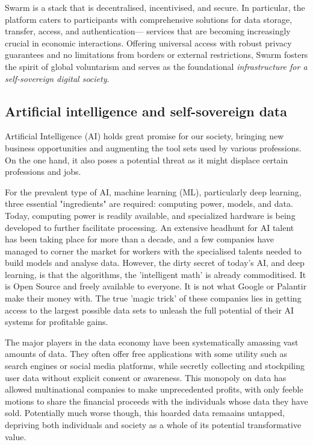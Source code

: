 Swarm is a  stack that is decentralised, incentivised, and secure. In particular, the platform caters to participants with comprehensive solutions for data storage, transfer, access, and authentication— services that are becoming increasingly crucial in economic interactions. Offering universal access with robust privacy guarantees and no limitations from borders or external restrictions, Swarm fosters the spirit of global voluntarism and serves as the foundational \emph{infrastructure for a self-sovereign digital society}.

\subsection{Artificial intelligence and self-sovereign data \statusgreen} \label{sec:AIdata}

Artificial Intelligence (AI) holds great promise for our society, bringing new business opportunities and augmenting the tool sets used by various professions. On the one hand, it also poses a potential threat as it might displace certain professions and jobs\cite{Lee2018Sep}.

For the prevalent type of AI, machine learning (ML), particularly deep learning, three essential "ingredients" are required: computing power, models, and data. Today, computing power is readily available, and specialized hardware is being developed to further facilitate processing. An extensive headhunt for AI talent has been taking place for more than a decade, and a few companies have managed to corner the market for workers with the specialised talents needed to build models and analyse data. However, the dirty secret of today's AI, and deep learning, is that the algorithms, the 'intelligent math' is already commoditised. It is Open Source and freely available to everyone. It is not what Google or Palantir make their money with. The true 'magic trick' of these companies lies in getting access to the largest possible data sets to unleash the full potential of their AI systems for profitable gains.

The major players in the data economy have been systematically amassing vast amounts of data. They often offer  free applications with some utility such as search engines or social media platforms, while secretly collecting and stockpiling user data without explicit consent or awareness. This monopoly on data has allowed multinational companies to make unprecedented profits, with only feeble motions to share the financial proceeds with the individuals whose data they have sold. Potentially much worse though, this hoarded data remaains untapped, depriving both individuals and society as a whole of its potential transformative value.

